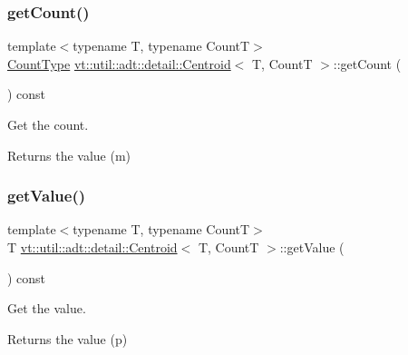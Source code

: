 \subsubsection{\texorpdfstring{get\+Count()}{getCount()}}
{\footnotesize\ttfamily template$<$typename T, typename CountT$>$ \\
\hyperlink{structvt_1_1util_1_1adt_1_1detail_1_1_centroid_ac3815361e4f13eeb8b2863d2eb8db1dd}{Count\+Type} \hyperlink{structvt_1_1util_1_1adt_1_1detail_1_1_centroid}{vt\+::util\+::adt\+::detail\+::\+Centroid}$<$ T, CountT $>$\+::get\+Count (\begin{DoxyParamCaption}{ }\end{DoxyParamCaption}) const\hspace{0.3cm}{\ttfamily [inline]}}



Get the count. 

\begin{DoxyReturn}{Returns}
the value (m) 
\end{DoxyReturn}
\mbox{\label{structvt_1_1util_1_1adt_1_1detail_1_1_centroid_a16f468b91d64cd35579e5ca7785b7ff4}} 
\subsubsection{\texorpdfstring{get\+Value()}{getValue()}}
{\footnotesize\ttfamily template$<$typename T, typename CountT$>$ \\
T \hyperlink{structvt_1_1util_1_1adt_1_1detail_1_1_centroid}{vt\+::util\+::adt\+::detail\+::\+Centroid}$<$ T, CountT $>$\+::get\+Value (\begin{DoxyParamCaption}{ }\end{DoxyParamCaption}) const\hspace{0.3cm}{\ttfamily [inline]}}



Get the value. 

\begin{DoxyReturn}{Returns}
the value (p) 
\end{DoxyReturn}
\mbox{\label{structvt_1_1util_1_1adt_1_1detail_1_1_centroid_a07ab1f2d6f0497b8b98ce27672d9f0b2}} 
